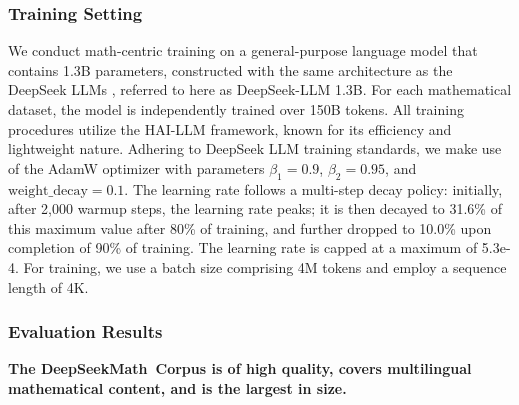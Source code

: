 \begin{itemize}[topsep=0pt]
\subsubsection{Training Setting}
\label{sec:quality-policy}
We conduct math-centric training on a general-purpose language model that contains 1.3B parameters, constructed with the same architecture as the DeepSeek LLMs \citep{deepseek-llm}, referred to here as DeepSeek-LLM 1.3B. For each mathematical dataset, the model is independently trained over 150B tokens. All training procedures utilize the HAI-LLM \citep{haillm} framework, known for its efficiency and lightweight nature. Adhering to DeepSeek LLM training standards, we make use of the AdamW optimizer \citep{adamW} with parameters $\beta_1=0.9$, $\beta_2=0.95$, and $\mathrm{weight\_decay}=0.1$. The learning rate follows a multi-step decay policy: initially, after 2,000 warmup steps, the learning rate peaks; it is then decayed to 31.6\% of this maximum value after 80\% of training, and further dropped to 10.0\% upon completion of 90\% of training. The learning rate is capped at a maximum of 5.3e-4. For training, we use a batch size comprising 4M tokens and employ a sequence length of 4K.

\subsubsection{Evaluation Results}

\textbf{The DeepSeekMath~Corpus is of high quality, covers multilingual mathematical content, and is the largest in size.}


\end{itemize}

